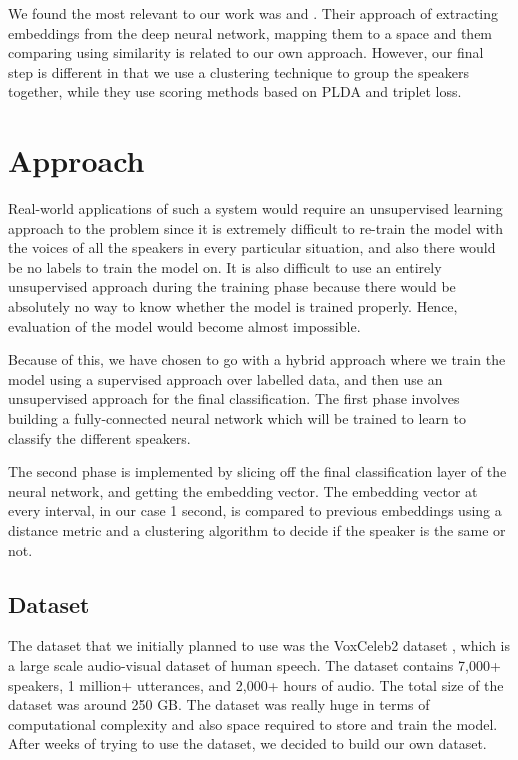 \documentclass[10pt,twocolumn,letterpaper]{article}
\begin{document}
We found the most relevant to our work was \cite{li2017deep} and \cite{deep}. Their approach of extracting embeddings from the deep neural network, mapping them to a space and them comparing using similarity is related to our own approach. However, our final step is different in that we use a clustering technique to group the speakers together, while they use scoring methods based on PLDA and triplet loss.


\section{Approach}

Real-world applications of such a system would require an unsupervised learning approach to the problem since it is extremely difficult to re-train the model with the voices of all the speakers in every particular situation, and also there would be no labels to train the model on. It is also difficult to use an entirely unsupervised approach during the training phase because there would be absolutely no way to know whether the model is trained properly. Hence, evaluation of the model would become almost impossible.

Because of this, we have chosen to go with a hybrid approach where we train the model using a supervised approach over labelled data, and then use an unsupervised approach for the final classification. The first phase involves building a fully-connected neural network which will be trained to learn to classify the different speakers. 

The second phase is implemented by slicing off the final classification layer of the neural network, and getting the embedding vector. The embedding vector at every interval, in our case 1 second, is compared to previous embeddings using a distance metric and a clustering algorithm  to decide if the speaker is the same or not.

\subsection{Dataset}

The dataset that we initially planned to use was the VoxCeleb2 dataset \cite{base}, which is a large scale audio-visual dataset of human speech. The dataset contains 7,000+ speakers, 1 million+ utterances, and 2,000+ hours of audio. The total size of the dataset was around 250 GB. The dataset was really huge in terms of computational complexity and also space required to store and train the model. After weeks of trying to use the dataset, we decided to build our own dataset. 
\end{document}

